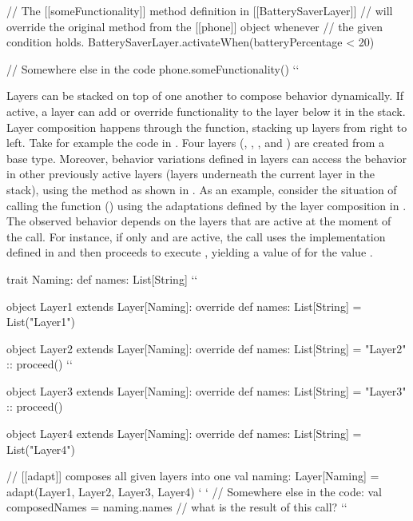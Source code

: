 \begin{scala}[label=lst:declarative-activation, caption=Declarative activation mechanism]
// The [[someFunctionality]] method definition in [[BatterySaverLayer]]
// will override the original method from the [[phone]] object whenever
// the given condition holds.
BatterySaverLayer.activateWhen(batteryPercentage < 20) 

// Somewhere else in the code 
phone.someFunctionality() `\label{ln:declartive-call}`
\end{scala}

Layers can be stacked on top of one another to compose behavior dynamically.
If active, a layer can add or override functionality to the layer below it in the stack.
Layer composition happens through the  function, stacking up layers from right to left.
Take for example the code in . Four layers (, , 
, and ) are created from a base  type.
Moreover, behavior variations defined in layers can access the behavior in other previously active 
layers (\ie layers underneath the current layer in the stack), using the  method 
as shown in . As an example, consider the situation of 
calling the  function () using the adaptations 
defined by the layer composition in .
The observed behavior depends on the layers that are active at the moment of the call. For instance, 
if only  and  are active, the call uses the implementation defined in 
 and then proceeds to execute , yielding 
a value of  for the value .

\begin{scala}[label=lst:layer-composition, caption=Layer Composition]
trait Naming:
  def names: List[String] `\label{ln:layer-composition.abstract-method}`

object Layer1 extends Layer[Naming]:
  override def names: List[String] =
    List("Layer1")

object Layer2 extends Layer[Naming]:
  override def names: List[String] =
    "Layer2" :: proceed() `\label{ln:layer-composition.proceed-example}`

object Layer3 extends Layer[Naming]:
  override def names: List[String] =
    "Layer3" :: proceed()

object Layer4 extends Layer[Naming]:
  override def names: List[String] =
    List("Layer4")

// [[adapt]] composes all given layers into one
val naming: Layer[Naming] = adapt(Layer1, Layer2, Layer3, Layer4) ` \label{ln:adaptation} `
// Somewhere else in the code:
val composedNames = naming.names // what is the result of this call? `\label{ln:layer-composition.adapted-layer}`
\end{scala}

